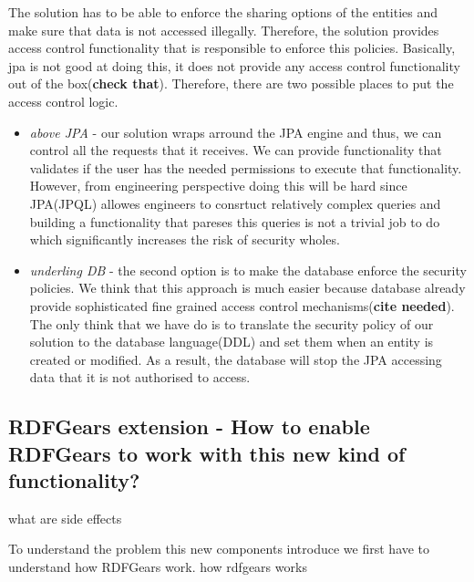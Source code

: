 \documentclass[a4paper, notitlepage]{article}
\begin{document}
The solution has to be able to enforce the sharing options of the entities and make sure that data is not accessed illegally. Therefore, the solution provides access control functionality that is responsible to enforce this policies. Basically, jpa is not good at doing this, it does not provide any access control functionality out of the box(\textbf{check that}). Therefore, there are two possible places to put the access control logic. 

\begin{itemize}
	\item \textit{above JPA} - our solution wraps arround the JPA engine and thus, we can control all the requests that it receives. We can provide functionality that validates if the user has the needed permissions to execute that functionality. However, from engineering perspective doing this will be hard since JPA(JPQL) allowes engineers to consrtuct relatively complex queries and building a functionality that pareses this queries is not a trivial job to do which significantly increases the risk of security wholes.
	
	\item \textit{underling DB} - the second option is to make the database enforce the security policies. We think that this approach is much easier because database already provide sophisticated fine grained access control mechanisms(\textbf{cite needed}). The only think that we have do is to translate the security policy of our solution to the database language(DDL) and set them when an entity is created or modified. As a result, the database will stop the JPA accessing data that it is not authorised to access.
\end{itemize}

\subsection{RDFGears extension - How to enable RDFGears to work with this new kind of functionality?}
what are side effects

To understand the problem this new components introduce we first have to understand how RDFGears work. 
how rdfgears works
\end{document}
